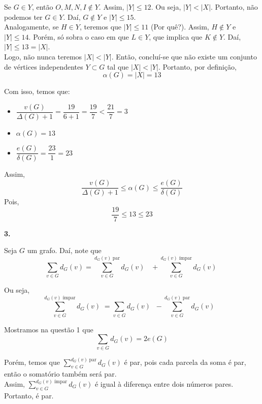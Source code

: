 \documentclass[12pt, a4paper]{article}
\begin{document}
Se \(G \in Y\), então \(O, M, N, I \notin Y\). Assim, \(|Y| \leq 12\). Ou seja, \(|Y| < |X|\). Portanto, não podemos ter \(G \in Y\). Daí, \(G \notin Y\) e \(|Y| \leq 15\). \\

Analogamente, se \(H \in Y\), teremos que \(|Y| \leq 11\) (Por quê?). Assim, \(H \notin Y\) e \(|Y| \leq 14\). Porém, só sobra o caso em que \(L \in Y\), que implica que \(K \notin Y\). Daí, \(|Y| \leq 13 = |X|\). \\

Logo, não nunca teremos \(|X| < |Y|\). Então, concluí-se que não existe um conjunto de vértices independentes \(Y \subset G\) tal que \(|X| < |Y|\). Portanto, por definição, \[\alpha(G) = |X| = 13\]  
 
Com isso, temos que:

\begin{itemize}
\item \(\dfrac{v(G)}{\Delta(G)+1}= \dfrac{19}{6+1}=\dfrac{19}{7} < \dfrac{21}{7} = 3\)

\item \(\alpha(G)=13\)

\item \(\dfrac{e(G)}{\delta(G)}=\dfrac{23}{1}=23\)
\end{itemize}

Assim, \[\dfrac{v(G)}{\Delta(G) + 1} \leq \alpha(G) \leq \dfrac{e(G)}{\delta(G)}\] Pois, 
\[\dfrac{19}{7} \leq 13 \leq 23\]

\textbf{3.}

Seja \(G\) um grafo. Daí, note que \[\sum \limits_{v \in G} d_G(v) = \sum \limits_{v \in G}^{d_G(v) \; \text{par}}\! \! \! \! \!d_G(v)  \; \; \; + \sum \limits_{v \in G}^{d_G(v) \text{ ímpar}}\! \! \! \! \! \!d_G(v)  \;  \]

Ou seja, \[\sum \limits_{v \in G}^{d_G(v) \text{ ímpar}}\! \! \! \! \! \!d_G(v)  \;  = \sum \limits_{v \in G} d_G(v) \; \;  - \sum \limits_{v \in G}^{d_G(v) \; \text{par}}\! \! \! \! \!d_G(v)  \; \; \; \]

Mostramos na questão 1 que \[\sum \limits_{v \in G} d_G(v) = 2e(G)\]

Porém, temos que \(\sum \limits_{v \in G}^{d_G(v) \; \text{par}}\! \! \! \! \!d_G(v)  \) é par, pois cada parcela da soma é par, então o somatório também será par. \\

Assim, \(\sum \limits_{v \in G}^{d_G(v) \text{ ímpar}}\! \! \! \! \! \!d_G(v)\) é igual à diferença entre dois números pares. Portanto, é par. \\
\end{document}
